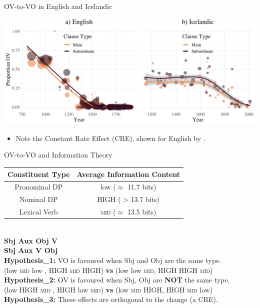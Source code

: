 \documentclass[hyperref={pdfpagelabels=false}]{beamer}
\begin{document}
\begin{frame}{OV-to-VO in English and Icelandic} 
	

	\includegraphics[width=1.04\textwidth]{FullClauseFig.png}
	\begin{itemize}
	\item Note the Constant Rate Effect (CRE), shown for English by \citet{pintzuktaylor2006}.
\end{itemize}	
\end{frame}

\begin{frame}{OV-to-VO and Information Theory} 
	
	\begin{center}
\begin{tabular}{c c}
	
	\textbf{Constituent Type} & \textbf{Average Information Content} \\ \hline
	Pronominal DP & low ($\approx$ 11.7 bits)\\
	Nominal DP & HIGH ( > 13.7 bits) \\
	Lexical  Verb & \textsc{mid} ($\approx$ 13.5 bits) \\
\end{tabular}
\\\vspace*{5mm}
 \textbf{Sbj Aux Obj V}\\
\textbf{Sbj Aux V Obj}\\\vspace*{5mm}
\textbf{Hypothesis_1:} VO is favoured when Sbj and Obj are the same type.\\\vspace*{1mm} (low \textsc{mid} low , HIGH \textsc{mid} HIGH) \textbf{vs} (low low \textsc{mid}, HIGH HIGH \textsc{mid})  \\\vspace*{4mm}
\textbf{Hypothesis_2:} OV is favoured when Sbj, Obj are \textbf{NOT} the same type.\\\vspace{1mm} (low HIGH \textsc{mid} , HIGH low \textsc{mid}) \textbf{vs} (low \textsc{mid} HIGH, HIGH \textsc{mid} low)\\\vspace*{4mm}
\textbf{Hypothesis_3:} These effects are orthogonal to the change (a CRE).
\end{center}
\end{frame}
\end{document}

